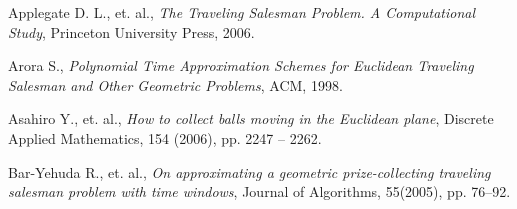 \begin{thebibliography}{100}

Applegate D. L., et. al., \emph{The Traveling Salesman Problem. A Computational Study}, Princeton University Press, 2006.

Arora S., \emph{Polynomial Time Approximation Schemes for Euclidean Traveling Salesman and Other Geometric Problems}, ACM, 1998.

Asahiro Y., et. al., \emph{How to collect balls moving in the Euclidean plane}, Discrete Applied Mathematics, 154 (2006), pp. 2247 – 2262.

Bar-Yehuda R., et. al., \emph{On approximating a geometric prize-collecting traveling salesman problem with time windows}, Journal of Algorithms, 55(2005), pp. 76–92.




\end{thebibliography}